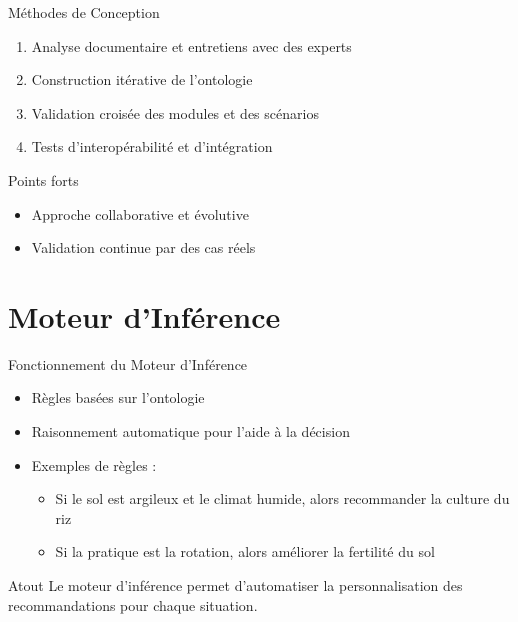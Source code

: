 \documentclass{beamer}
\begin{document}
\begin{frame}{Méthodes de Conception}
  \begin{enumerate}
    \item Analyse documentaire et entretiens avec des experts
    \item Construction itérative de l'ontologie
    \item Validation croisée des modules et des scénarios
    \item Tests d'interopérabilité et d'intégration
  \end{enumerate}
  \pause
  \begin{block}{Points forts}
    \begin{itemize}
      \item Approche collaborative et évolutive
      \item Validation continue par des cas réels
    \end{itemize}
  \end{block}
\end{frame}

\section{Moteur d'Inférence}
\begin{frame}{Fonctionnement du Moteur d'Inférence}
  \begin{itemize}
    \item Règles basées sur l'ontologie
    \item Raisonnement automatique pour l'aide à la décision
    \item Exemples de règles :
    \begin{itemize}
      \item Si le sol est argileux et le climat humide, alors recommander la culture du riz
      \item Si la pratique est la rotation, alors améliorer la fertilité du sol
    \end{itemize}
  \end{itemize}
  \pause
  \begin{alertblock}{Atout}
    Le moteur d’inférence permet d’automatiser la personnalisation des recommandations pour chaque situation.
  \end{alertblock}
\end{frame}
\end{document}
